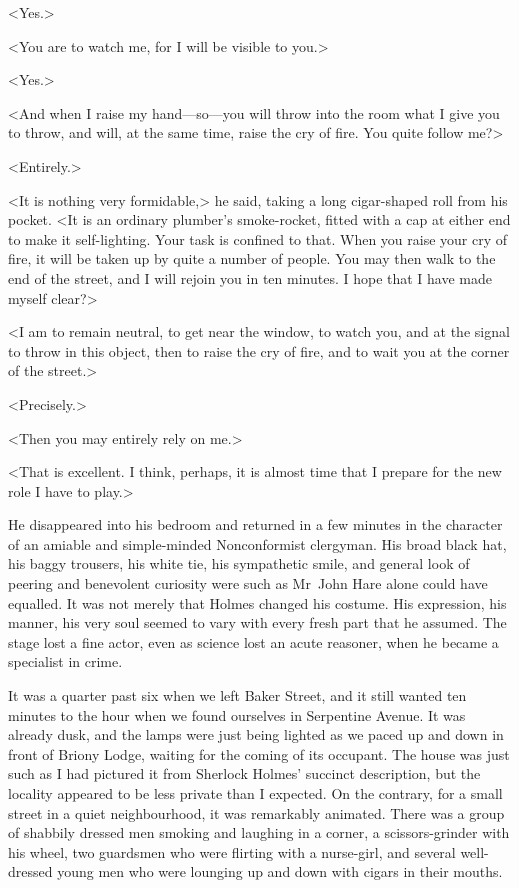 <Yes.>

<You are to watch me, for I will be visible to you.>

<Yes.>

<And when I raise my hand—so—you will throw into the room what I give you to throw, and will, at the same time, raise the cry of fire. You quite follow me?>

<Entirely.>

<It is nothing very formidable,> he said, taking a long cigar-shaped roll from his pocket. <It is an ordinary plumber's smoke-rocket, fitted with a cap at either end to make it self-lighting. Your task is confined to that. When you raise your cry of fire, it will be taken up by quite a number of people. You may then walk to the end of the street, and I will rejoin you in ten minutes. I hope that I have made myself clear?>

<I am to remain neutral, to get near the window, to watch you, and at the signal to throw in this object, then to raise the cry of fire, and to wait you at the corner of the street.>

<Precisely.>

<Then you may entirely rely on me.>

<That is excellent. I think, perhaps, it is almost time that I prepare for the new role I have to play.>

He disappeared into his bedroom and returned in a few minutes in the character of an amiable and simple-minded Nonconformist clergyman. His broad black hat, his baggy trousers, his white tie, his sympathetic smile, and general look of peering and benevolent curiosity were such as Mr~John Hare alone could have equalled. It was not merely that Holmes changed his costume. His expression, his manner, his very soul seemed to vary with every fresh part that he assumed. The stage lost a fine actor, even as science lost an acute reasoner, when he became a specialist in crime.

It was a quarter past six when we left Baker Street, and it still wanted ten minutes to the hour when we found ourselves in Serpentine Avenue. It was already dusk, and the lamps were just being lighted as we paced up and down in front of Briony Lodge, waiting for the coming of its occupant. The house was just such as I had pictured it from Sherlock Holmes' succinct description, but the locality appeared to be less private than I expected. On the contrary, for a small street in a quiet neighbourhood, it was remarkably animated. There was a group of shabbily dressed men smoking and laughing in a corner, a scissors-grinder with his wheel, two guardsmen who were flirting with a nurse-girl, and several well-dressed young men who were lounging up and down with cigars in their mouths.

